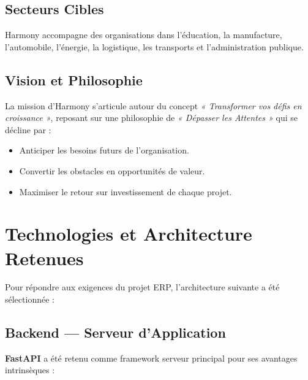 \subsection{Secteurs Cibles}

Harmony accompagne des organisations dans l'éducation, la manufacture, l'automobile, l'énergie, la logistique, les transports et l'administration publique.

\subsection{Vision et Philosophie}

La mission d'Harmony s'articule autour du concept \textit{« Transformer vos défis en croissance »}, reposant sur une philosophie de \textit{« Dépasser les Attentes »} qui se décline par :

\begin{itemize}
    \item Anticiper les besoins futurs de l'organisation.
    \item Convertir les obstacles en opportunités de valeur.
    \item Maximiser le retour sur investissement de chaque projet.
\end{itemize}

\section{Technologies et Architecture Retenues}

Pour répondre aux exigences du projet \gls{ERP}, l'architecture suivante a été sélectionnée :

\subsection{Backend — Serveur d'Application}

\textbf{\Gls{FastAPI}} a été retenu comme framework serveur principal pour ses avantages intrinsèques :

